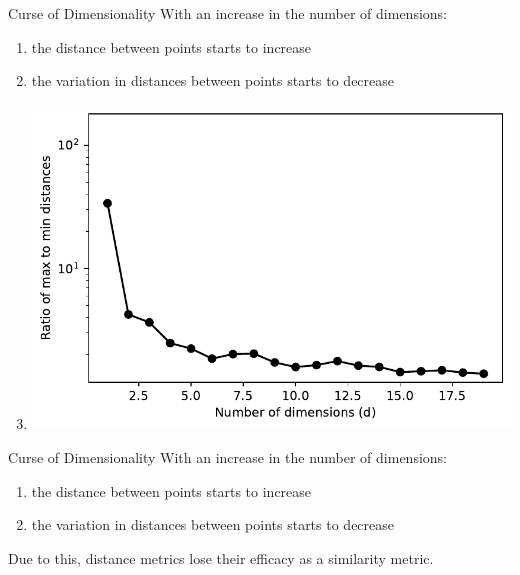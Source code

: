 \documentclass[usenames,dvipsnames]{beamer}
\begin{document}
\begin{frame}{Curse of Dimensionality}
With an increase in the number of dimensions:
\begin{enumerate}
\item the distance between points starts to increase
\item the variation in distances between points starts to decrease
\item[] {\centering \includegraphics[height=0.6\textheight]{../assets/knn/figures/curse_spread.pdf}}
\end{enumerate}
\end{frame}

\begin{frame}{Curse of Dimensionality}
With an increase in the number of dimensions:
\begin{enumerate}
\item the distance between points starts to increase
\item the variation in distances between points starts to decrease
\end{enumerate}
Due to this, distance metrics lose their efficacy as a similarity metric.
\end{frame}
\end{document}

